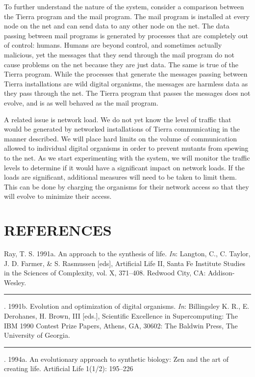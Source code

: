 To further understand the nature of the system, consider a comparison
between the Tierra program and the mail program.  The mail program is
installed at every node on the net and can send data to any other node
on the net.  The data passing between mail programs is generated by
processes that are completely out of control: humans.  Humans are beyond
control, and sometimes actually malicious, yet the messages that they
send through the mail program do not cause problems on the net because
they are just data.  The same is true of the Tierra program.  While the
processes that generate the messages passing between Tierra installations
are wild digital organisms, the messages are harmless data as they pass
through the net.  The Tierra program that passes the messages
does not evolve, and is as well behaved as the mail program.

A related issue is network load.  We do not yet know the
level of traffic that would be generated by networked installations
of Tierra communicating in the manner described.  We will place hard
limits on the volume of communication allowed to individual digital
organisms in order to prevent mutants from spewing to the net.  As we
start experimenting with the system, we will monitor the traffic levels
to determine if it would have a significant impact on network loads.
If the loads are significant, additional measures will need to be taken
to limit them.  This can be done by charging the organisms for their
network access so that they will evolve to minimize their access.

\section{\bf REFERENCES}

\XP

Ray, T. S.  1991a.  An approach to the synthesis of life.
{\em In\/}: Langton, C., C. Taylor, J. D. Farmer, \& S. Rasmussen [eds],
Artificial Life II, Santa Fe Institute Studies in the Sciences of
Complexity, vol. X, 371--408.  Redwood City, CA: Addison-Wesley.

\rule[0pt]{3em}{.4pt}.  1991b.  Evolution and optimization of digital
organisms.  {\em In\/}: Billingsley K. R., E. Derohanes, H. Brown, III [eds.],
Scientific Excellence in Supercomputing: The IBM 1990 Contest Prize Papers,
Athens, GA, 30602: The Baldwin Press, The University of Georgia.

\rule[0pt]{3em}{.4pt}.  1994a.  An evolutionary approach to synthetic
biology: Zen and the art of creating life.  Artificial Life 1(1/2): 195--226

